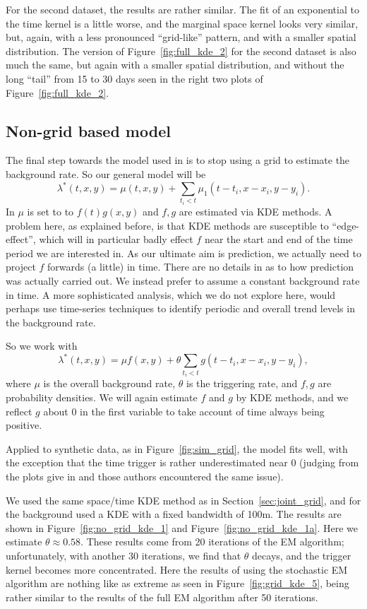 \documentclass[twoside,a4paper]{article}
\theoremstyle{plain}
\theoremstyle{definition}
\begin{document}
For the second dataset, the results are rather similar.  The fit of an exponential to the
time kernel is a little worse, and the marginal space kernel looks very similar, but, again, with
a less pronounced ``grid-like'' pattern, and with a smaller spatial distribution.
The version of Figure~\ref{fig:full_kde_2} for the second dataset is also much the same, but
again with a smaller spatial distribution, and without the long ``tail'' from 15 to 30
days seen in the right two plots of Figure~\ref{fig:full_kde_2}.




\subsection{Non-grid based model}\label{sec:no_grid_kde}

The final step towards the model used in \cite{sepp2} is to stop using a grid to estimate
the background rate.  So our general model will be
\[ \lambda^*(t,x,y) = \mu(t,x,y) + \sum_{t_i < t} \mu_1(t-t_i, x-x_i, y-y_i). \]
In \cite{sepp2} $\mu$ is set to to $f(t)g(x,y)$ and $f,g$ are estimated via KDE methods.
A problem here, as explained before, is that KDE methods are susceptible to ``edge-effect'',
which will in particular badly effect $f$ near the start and end of the time period we are
interested in.  As our ultimate aim is prediction, we actually need to project $f$ forwards
(a little) in time.  There are no details in \cite{sepp2} as to how prediction was actually
carried out.  We instead prefer to assume a constant background rate in time.
A more sophisticated analysis, which we do not explore here, would perhaps use time-series
techniques to identify periodic and overall trend levels in the background rate.

So we work with
\[ \lambda^*(t,x,y) = \mu f(x,y) + \theta \sum_{t_i < t} g(t-t_i, x-x_i, y-y_i), \]
where $\mu$ is the overall background rate, $\theta$ is the triggering rate, and $f,g$
are probability densities.  We will again estimate $f$ and $g$ by KDE methods, and we
reflect $g$ about $0$ in the first variable to take account of time always being positive.

Applied to synthetic data, as in Figure~\ref{fig:sim_grid}, the model fits well, with the
exception that the time trigger is rather underestimated near $0$ (judging from the plots give in
\cite{sepp} and \cite{rc} those authors encountered the same issue).  

We used the same space/time KDE method as in Section~\ref{sec:joint_grid}, and for the background
used a KDE with a fixed bandwidth of 100m.  The results are shown in Figure~\ref{fig:no_grid_kde_1}
and Figure~\ref{fig:no_grid_kde_1a}.  Here we estimate $\theta\approx 0.58$.  These results
come from 20 iterations of the EM algorithm; unfortunately, with another 30 iterations,
we find that $\theta$ decays, and the trigger kernel becomes more concentrated.
Here the results of using the stochastic EM algorithm are nothing like as extreme as
seen in Figure~\ref{fig:grid_kde_5}, being rather similar to the results of the full EM
algorithm after 50 iterations.
\end{document}
